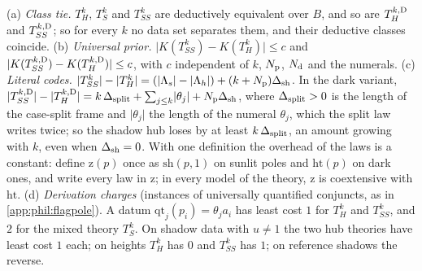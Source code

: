 \begin{proposition}\label{prop:phil:flagpolesystem}
(a) \emph{Class tie.} $T^k_H$, $T^k_S$ and $T^k_{SS}$ are deductively equivalent over $B$, and so are $T^{k,\rm D}_H$ and $T^{k,\rm D}_{SS}$; so for every $k$ no data set separates them, and their deductive classes coincide.
(b) \emph{Universal prior.} $\lvert K(T^k_{SS})-K(T^k_H)\rvert\le c$ and $\lvert K(T^{k,\rm D}_{SS})-K(T^{k,\rm D}_H)\rvert\le c$, with $c$ independent of $k$, $N_{\rm p}$, $N_{\rm d}$ and the numerals.
(c) \emph{Literal codes.} $\lvert T^k_{SS}\rvert-\lvert T^k_H\rvert=(\lvert\Lambda_s\rvert-\lvert\Lambda_h\rvert)+(k+N_{\rm p})\Delta_{\rm sh}$. In the dark variant, $\lvert T^{k,\rm D}_{SS}\rvert-\lvert T^{k,\rm D}_H\rvert=k\,\Delta_{\rm split}+\sum_{j\le k}\lvert\theta_j\rvert+N_{\rm p}\Delta_{\rm sh}$, where $\Delta_{\rm split}>0$ is the length of the case-split frame and $\lvert\theta_j\rvert$ the length of the numeral $\theta_j$, which the split law writes twice; so the shadow hub loses by at least $k\,\Delta_{\rm split}$, an amount growing with $k$, even when $\Delta_{\rm sh}=0$. With one definition the overhead of the laws is a constant: define $\mathrm{z}(p)$ once as $\mathrm{sh}(p,1)$ on sunlit poles and $\mathrm{ht}(p)$ on dark ones, and write every law in $\mathrm{z}$; in every model of the theory, $\mathrm{z}$ is coextensive with $\mathrm{ht}$.
(d) \emph{Derivation charges} (instances of universally quantified conjuncts, as in \cref{app:phil:flagpole}). A datum $\mathrm{qt}_j(p_i)=\theta_ja_i$ has least cost $1$ for $T^k_H$ and $T^k_{SS}$, and $2$ for the mixed theory $T^k_S$. On shadow data with $u\ne1$ the two hub theories have least cost $1$ each; on heights $T^k_H$ has $0$ and $T^k_{SS}$ has $1$; on reference shadows the reverse.
\end{proposition}

